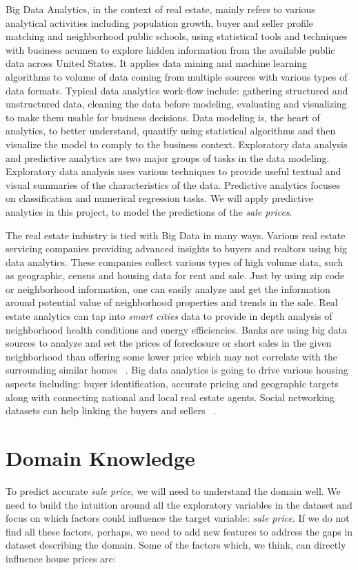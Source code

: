 \documentclass[sigconf]{acmart}
\begin{document}
	Big Data Analytics, in the context of real estate, mainly refers to various analytical activities including population growth,  buyer and seller profile matching and neighborhood public schools, using statistical tools and techniques with business acumen to explore hidden information from the available public data across United States. It applies data mining and machine learning algorithms to volume of data coming from multiple sources with various types of data formats. Typical data analytics work-flow include: gathering structured and unstructured data, cleaning the data before modeling, evaluating and visualizing to make them usable for business decisions. Data modeling is, the heart of analytics, to better understand, quantify using statistical algorithms and then visualize the model to comply to the business context. Exploratory data analysis and predictive analytics are two major groups of tasks in the data modeling. Exploratory data analysis uses various techniques to provide useful textual and visual summaries of the characteristics of the data. Predictive analytics focuses on classification and numerical regression tasks. We will apply predictive analytics in this project, to model the predictions of the {\em sale prices}.
	
	The real estate industry is tied with Big Data in many ways. Various real estate servicing companies providing advanced insights to buyers and realtors using big data analytics. These companies collect various types of high volume data, such as geographic, census and housing data for rent and sale. Just by using zip code or neighborhood information, one can easily analyze and get the information around potential value of neighborhood properties and trends in the sale. Real estate analytics can tap into {\em smart cities} data to provide in depth analysis of neighborhood health conditions and energy efficiencies. Banks are using big data sources to analyze and set the prices of foreclosure or short sales in the given neighborhood than offering some lower price which may not correlate with the surrounding similar homes ~\cite{james-2017}. Big data analytics is going to drive various housing aspects including: buyer identification, accurate pricing and geographic targets ~\cite{athena-snow-2017} along with connecting national and local real estate agents. Social networking datasets can help linking the buyers and sellers ~\cite{young-2017}. 
	
	\section{Domain Knowledge}
	To predict accurate {\em sale price}, we will need to understand the domain well. We need to build the intuition around all the exploratory variables in the dataset and focus on which factors could influence the target variable: {\em sale price}. If we do not find all these factors, perhaps, we need to add new features to address the gaps in dataset describing the domain. Some of the factors which, we think, can directly influence house prices are:
	
\end{document}
